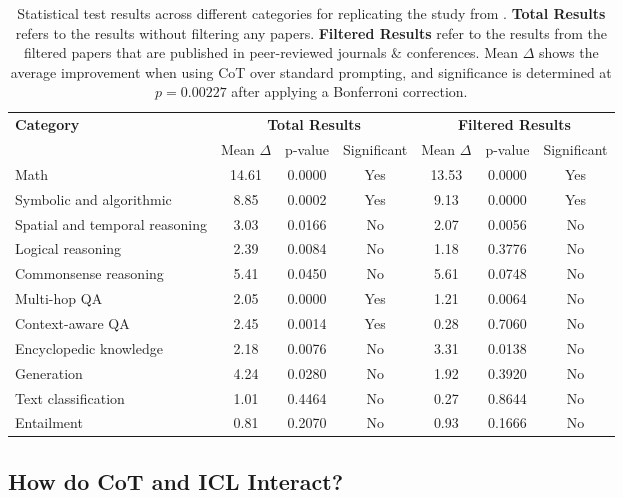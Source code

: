 \begin{table*}[ht]  
\centering  
\small  
\renewcommand{\arraystretch}{1.3}  
\begin{tabular}{l|c|cc|c|cc}  
\toprule  
\multirow{2}{*}{\textbf{Category}} & \multicolumn{3}{c|}{\textbf{Total Results}} & \multicolumn{3}{c}{\textbf{Filtered Results}} \\  
& Mean $\Delta$ & p-value & Significant & Mean $\Delta$ & p-value & Significant \\  
\midrule  
Math & 14.61 & 0.0000 & Yes & 13.53 & 0.0000 & Yes \\  
Symbolic and algorithmic & 8.85 & 0.0002 & Yes & 9.13 & 0.0000 & Yes \\  
Spatial and temporal reasoning & 3.03 & 0.0166 & No & 2.07 & 0.0056 & No \\  
Logical reasoning & 2.39 & 0.0084 & No & 1.18 & 0.3776 & No \\  
Commonsense reasoning & 5.41 & 0.0450 & No & 5.61 & 0.0748 & No \\  
Multi-hop QA & 2.05 & 0.0000 & Yes & 1.21 & 0.0064 & No \\  
Context-aware QA & 2.45 & 0.0014 & Yes & 0.28 & 0.7060 & No \\  
Encyclopedic knowledge & 2.18 & 0.0076 & No & 3.31 & 0.0138 & No \\  
Generation & 4.24 & 0.0280 & No & 1.92 & 0.3920 & No \\  
Text classification & 1.01 & 0.4464 & No & 0.27 & 0.8644 & No \\  
Entailment & 0.81 & 0.2070 & No & 0.93 & 0.1666 & No \\  
\bottomrule  
\end{tabular}  
\caption{Statistical test results across different categories for replicating the study from \citet{sprague2024cot}. \textbf{Total Results} refers to the results without filtering any papers. \textbf{Filtered Results} refer to the results from the filtered papers that are published in peer-reviewed journals \& conferences. Mean $\Delta$ shows the average improvement when using CoT over standard prompting, and significance is determined at $p=0.00227$ after applying a Bonferroni correction.}  
\label{tab:statistical-tests}
\end{table*}  


\subsection{How do CoT and ICL Interact?}
\label{subsection:joint_behavior}


